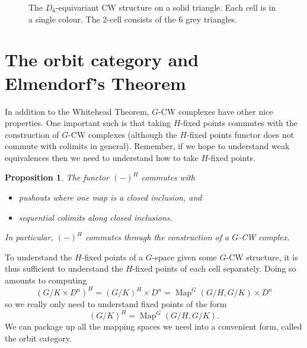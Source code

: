 \documentclass{amsart}
\newtheorem{prop}[thm]{Proposition}
\theoremstyle{definition}
\numberwithin{thm}{section}
\def\Map{\operatorname{Map}}
\begin{document}
\begin{figure}
    \centering
    \caption{The $D_6$-equivariant CW structure on a solid triangle. Each cell is in a single colour. The 2-cell consists of the 6 grey triangles.}
    \label{fig: triangle example}
\end{figure}

\section{The orbit category and Elmendorf's Theorem}

In addition to the Whitehead Theorem, $G$-CW complexes have other nice properties. One important such is that taking $H$-fixed points commutes with the construction of $G$-CW complexes (although the $H$-fixed points functor does not commute with colimits in general). Remember, if we hope to understand weak equivalences then we need to understand how to take $H$-fixed points.

\begin{prop} The functor $(-)^H$ commutes with 
    \begin{itemize}
        \item pushouts where one map is a closed inclusion, and
        \item sequential colimits along closed inclusions.
    \end{itemize}
    In particular, $(-)^H$ commutes through the construction of a $G$-CW complex. 
\end{prop}

To understand the $H$-fixed points of a $G$-space given some $G$-CW structure, it is thus sufficient to understand the $H$-fixed points of each cell separately. Doing so amounts to computing 
\[(G/K \times D^n)^H = (G/K)^H \times D^n = \Map^G(G/H, G/K) \times D^n\]
so we really only need to understand fixed points of the form 
\[(G/K)^H = \Map^G(G/H, G/K).\] 
We can package up all the mapping spaces we need into a convenient form, called the orbit category.
\end{document}
